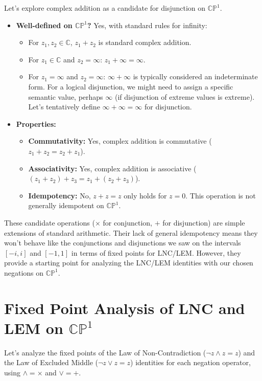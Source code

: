 	Let's explore complex addition as a candidate for disjunction on $\mathbb{CP}^1$.
	
	\begin{itemize}
		\item \textbf{Well-defined on $\mathbb{CP}^1$?} Yes, with standard rules for infinity:
		\begin{itemize}
			\item For $z_1, z_2 \in \mathbb{C}$, $z_1 + z_2$ is standard complex addition.
			\item For $z_1 \in \mathbb{C}$ and $z_2 = \infty$: $z_1 + \infty = \infty$.
			\item For $z_1 = \infty$ and $z_2 = \infty$: $\infty + \infty$ is typically considered an indeterminate form. For a logical disjunction, we might need to assign a specific semantic value, perhaps $\infty$ (if disjunction of extreme values is extreme). Let's tentatively define $\infty + \infty = \infty$ for disjunction.
		\end{itemize}
		
		\item \textbf{Properties:}
		\begin{itemize}
			\item \textbf{Commutativity:} Yes, complex addition is commutative ($z_1 + z_2 = z_2 + z_1$).
			\item \textbf{Associativity:} Yes, complex addition is associative ($(z_1 + z_2) + z_3 = z_1 + (z_2 + z_3)$).
			\item \textbf{Idempotency:} No, $z + z = z$ only holds for $z = 0$. This operation is not generally idempotent on $\mathbb{CP}^1$.
		\end{itemize}
	\end{itemize}
	These candidate operations ($\times$ for conjunction, $+$ for disjunction) are simple extensions of standard arithmetic. Their lack of general idempotency means they won't behave like the conjunctions and disjunctions we saw on the intervals $[-i, i]$ and $[-1, 1]$ in terms of fixed points for LNC/LEM. However, they provide a starting point for analyzing the LNC/LEM identities with our chosen negations on $\mathbb{CP}^1$.
	
	\section{Fixed Point Analysis of LNC and LEM on $\mathbb{CP}^1$}
	
	Let's analyze the fixed points of the Law of Non-Contradiction ($\neg z \wedge z = z$) and the Law of Excluded Middle ($\neg z \vee z = z$) identities for each negation operator, using $\wedge = \times$ and $\vee = +$.
	
